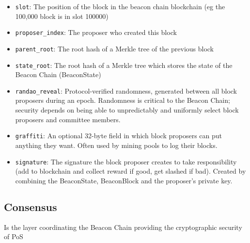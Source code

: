 \documentclass[fleqn,10pt]{olplainarticle}
\begin{document}
\begin{itemize}[noitemsep]
	\item \texttt{slot}: The position of the block in the beacon chain blockchain (eg the 100,000 block is in slot 100000)
	\item \texttt{proposer\_index}: The proposer who created this block
	\item \texttt{parent\_root}: The root hash of a Merkle tree of the previous block
	\item \texttt{state\_root}: The root hash of a Merkle tree which stores the state of the Beacon Chain (BeaconState)
	\item \texttt{randao\_reveal}: Protocol-verified randomness, generated between all block proposers during an epoch. Randomness is critical to the Beacon Chain; security depends on being able to unpredictably and uniformly select block proposers and committee members.
	\item \texttt{graffiti}: An optional 32-byte field in which block proposers can put anything they want. Often used by mining pools to log their blocks.
	\item \texttt{signature}: The signature the block proposer creates to take responsibility (add to blockchain and collect reward if good, get slashed if bad). Created by combining the BeaconState, BeaconBlock and the proposer's private key.
\end{itemize}

\subsection{Consensus}

Is the layer coordinating the Beacon Chain providing the cryptographic security of PoS
\end{document}
